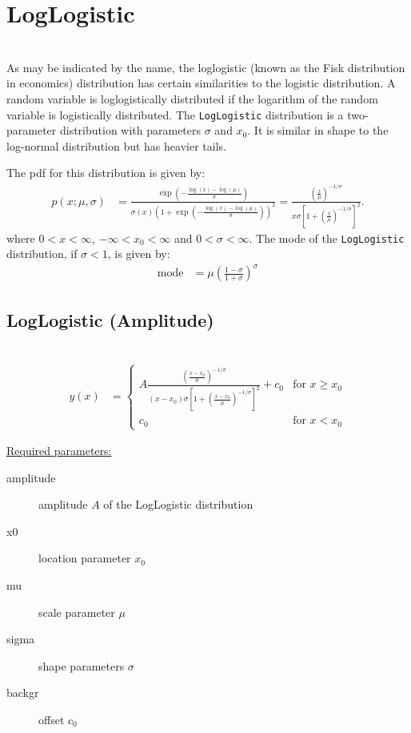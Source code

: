 \clearpage

\section{LogLogistic} ~\\
\label{sec:LogLogistic}
As may be indicated by the name, the loglogistic (known as the Fisk distribution in economics)
distribution has certain similarities to the logistic distribution. A random variable
is loglogistically distributed if the logarithm of the random variable is logistically distributed.
The \texttt{LogLogistic} distribution is a two-parameter distribution with parameters
$\sigma$ and $x_0$. It is similar in shape to the log-normal distribution but has heavier tails.

The pdf for this distribution is given by:
\begin{align}
p(x;\mu,\sigma) &=\frac{\exp\left(-\frac{\log\left(x\right)-\log(\mu)}{\sigma}\right)}{\sigma \left(x\right)\left(1+\exp\left(-\frac{\log(x)-\log(\mu)}{\sigma}\right)\right)^2}
= \frac{ \left(\frac{x}{\mu}\right)^{-1/\sigma} } { x\sigma\left[ 1+\left(\frac{x}{\mu}\right)^{-1/\sigma} \right]^2 }.
\end{align}
where $0 < x < \infty$, $-\infty < x_0 < \infty$ and $0 < \sigma < \infty$.
The mode of the \texttt{LogLogistic} distribution, if $\sigma < 1$, is given by:
\begin{align}
\mathrm{mode} &= \mu\left(\frac{1-\sigma}{1+\sigma}\right)^{\sigma}
\end{align}

\vspace{1cm}

\subsection{LogLogistic (Amplitude)} ~\\
\label{sec:LogLogisticAmplitude}
\begin{align}
y(x) &=
\begin{cases}
A \frac{ \left(\frac{x-x_0}{\mu}\right)^{-1/\sigma} } { \left(x-x_0\right)\sigma\left[ 1+\left(\frac{x-x_0}{\mu}\right)^{-1/\sigma} \right]^2 } +c_0 & \mbox{for } x \geq x_0\\
c_0 & \mbox{for } x<x_0
\end{cases}
\end{align}

\underline{Required parameters:}
\begin{description}
    \item[amplitude] amplitude $A$ of the LogLogistic distribution
    \item[x0] location parameter $x_0$
    \item[mu] scale parameter $\mu$
    \item[sigma] shape parameters $\sigma$
    \item[backgr] offset $c_0$
\end{description}

